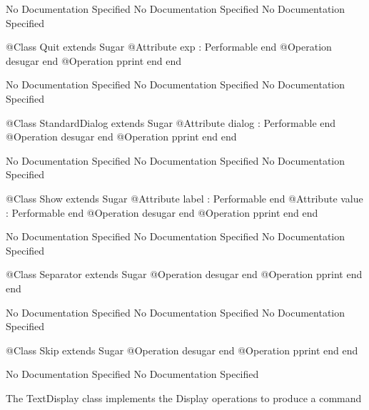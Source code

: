 No Documentation Specified
No Documentation Specified
No Documentation Specified
\begin{Interface}
@Class Quit extends Sugar
  @Attribute exp : Performable end
  @Operation desugar end
  @Operation pprint end
end
\end{Interface}
No Documentation Specified
No Documentation Specified
No Documentation Specified
\begin{Interface}
@Class StandardDialog extends Sugar
  @Attribute dialog : Performable end
  @Operation desugar end
  @Operation pprint end
end
\end{Interface}
No Documentation Specified
No Documentation Specified
No Documentation Specified
\begin{Interface}
@Class Show extends Sugar
  @Attribute label : Performable end
  @Attribute value : Performable end
  @Operation desugar end
  @Operation pprint end
end
\end{Interface}
No Documentation Specified
No Documentation Specified
No Documentation Specified
\begin{Interface}
@Class Separator extends Sugar
  @Operation desugar end
  @Operation pprint end
end
\end{Interface}
No Documentation Specified
No Documentation Specified
No Documentation Specified
\begin{Interface}
@Class Skip extends Sugar
  @Operation desugar end
  @Operation pprint end
end
\end{Interface}
No Documentation Specified
No Documentation Specified

      The TextDisplay class implements the Display operations to produce a command

